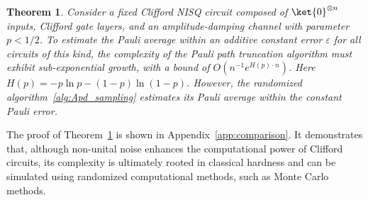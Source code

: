\documentclass[aps,%
twocolumn,%
floatfix,%
pra,%
amsfonts,%
longbibliography,%
groupedaddress,%
superscriptaddress]{revtex4-2}%
\newtheorem{theorem}{Theorem}
\newcommand{\1}{\mathbbm{1}}
\begin{document}
\begin{theorem}
\label{theo:toy_model_power}
   Consider a fixed Clifford NISQ circuit composed of $\ket{0}^{\otimes n}$ inputs, Clifford gate layers, and an amplitude-damping channel with parameter $p < 1/2$. To estimate the Pauli average within an additive constant error $\varepsilon$ for all circuits of this kind, the complexity of the Pauli path truncation algorithm must exhibit sub-exponential growth, with a bound of $O(n^{-1} e^{H(p) \cdot n})$. Here $H(p) = -p\ln p - (1-p)\ln (1-p)$. However, the randomized algorithm~\ref{alg:Apd_sampling} estimates its Pauli average within the constant Pauli error.
\end{theorem}
The proof of Theorem~\ref{theo:toy_model_power} is shown in Appendix~\ref{app:comparison}.  It demonstrates that, although non-unital noise enhances the computational power of Clifford circuits, its complexity is ultimately rooted in classical hardness and can be simulated using randomized computational methods, such as Monte Carlo methods.
\end{document}
